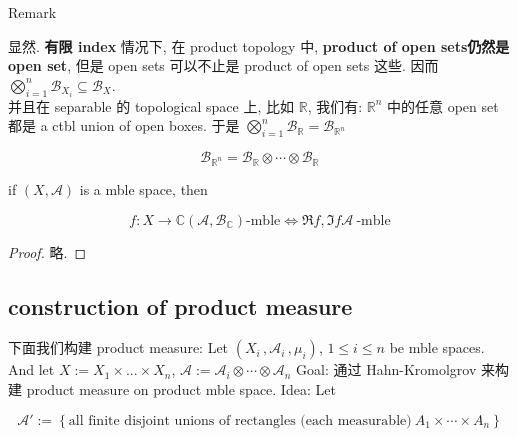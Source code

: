 \begin{qlremark}{Remark}

显然. \textbf{有限 index} 情况下, 在 product topology 中, \textbf{product of open sets仍然是 open set}, 但是 open sets 可以不止是 product of open sets 这些. 因而 \(\bigotimes_{i = 1}^{n}\mathcal{B}_{X_{i}} \subseteq \mathcal{B}_{X}\).\\
并且在 separable 的 topological space 上, 比如 \(\mathbb{R}\), 我们有: \(\mathbb{R}^{n}\) 中的任意 open set 都是 a ctbl union of open boxes. 于是 \(\bigotimes_{i = 1}^{n}\mathcal{B}_{\mathbb{R}} = \mathcal{B}_{\mathbb{R}^{n}}\)

\end{qlremark}

\begin{example}

\[\mathcal{B}_{\mathbb{R}^{n}} = \mathcal{B}_{\mathbb{R}} \otimes \cdots \otimes \mathcal{B}_{\mathbb{R}}\]

\end{example}

\begin{corollary}

if \((X,\mathcal{A})\) is a mble space, then

\[f:X\rightarrow\mathbb{C}(\mathcal{A},\mathcal{B}_{\mathbb{C}})\text{-mble}\Leftrightarrow\Re f,\Im f\mathcal{A}\ \text{-mble}\]

\end{corollary}

\begin{proof}

略.

\end{proof}

\subsection{construction of product measure}\label{construction-of-product-measure}

下面我们构建 product measure: Let \((X_{i}\,,\mathcal{A}_{i}\,,\mu_{i})\), \(1 \leq i \leq n\) be mble spaces.\\
And let \(X := X_{1} \times ... \times X_{n}\), \(\mathcal{A} := \mathcal{A}_{i} \otimes \cdots \otimes \mathcal{A}_{n}\) Goal: 通过 Hahn-Kromolgrov 来构建 product measure on product mble space. Idea: Let

\[\mathcal{A}' := \left\{ {\text{all finite disjoint unions of rectangles (each measurable)}\ A_{1} \times \cdots \times A_{n}} \right\}\]

